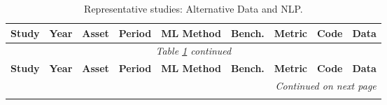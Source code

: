 \begin{longtable}{p{2.4cm} p{0.6cm} p{1.0cm} p{1.0cm} p{2.0cm} p{1.5cm} p{1.3cm} p{0.7cm} p{1.3cm}}
\caption{Representative studies: Alternative Data and NLP.}\label{tab:master_altdata} \\
\toprule
\textbf{Study} & \textbf{Year} & \textbf{Asset} & \textbf{Period} & \textbf{ML Method} & \textbf{Bench.} & \textbf{Metric} & \textbf{Code} & \textbf{Data} \\
\midrule
\endfirsthead
\multicolumn{9}{c}{\textit{Table \ref{tab:master_altdata} continued}} \\
\toprule
\textbf{Study} & \textbf{Year} & \textbf{Asset} & \textbf{Period} & \textbf{ML Method} & \textbf{Bench.} & \textbf{Metric} & \textbf{Code} & \textbf{Data} \\
\midrule
\endhead
\midrule
\multicolumn{9}{r}{\textit{Continued on next page}} \\
\endfoot
\bottomrule
\endlastfoot


\end{longtable}
